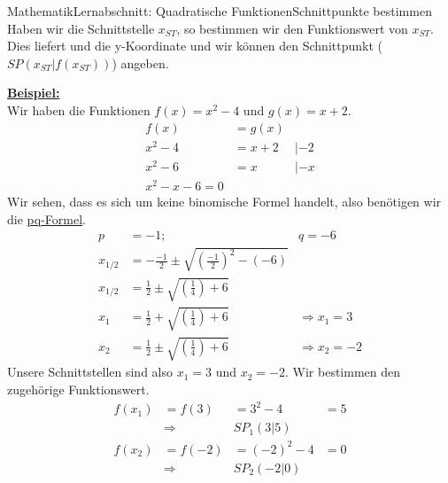 \documentclass[11pt,twocolumn,oneside,openany,headings=optiontotoc,11pt,numbers=noenddot]{article}
\begin{document}
\begin{worksheet}{Mathematik}{Lernabschnitt: Quadratische Funktionen}{Schnittpunkte bestimmen}
		Haben wir die Schnittstelle \(x_{ST}\), so bestimmen wir den Funktionswert von \(x_{ST}\). Dies liefert und die y-Koordinate und wir können den Schnittpunkt (\(SP(x_{ST}|f(x_{ST}))\)) angeben.
		\par\noindent
		\underline{\textbf{Beispiel:}}\\
		Wir haben die Funktionen \(f(x) = x^2 - 4\) und \(g(x) = x+2\).\\
		\begin{align*}
			f(x) & = g(x)\\
			x^2 - 4 & = x + 2 & | -2\\
			x^2 - 6 & = x & | -x\\
			x^2 -x -6 = 0
		\end{align*}
		Wir sehen, dass es sich um keine binomische Formel handelt, also benötigen wir die \underline{pq-Formel}.
		\begin{align*}
			p & = -1; & q = - 6\\
			x_{1/2} & = -\frac{-1}{2} \pm \sqrt{\left(\frac{-1}{2}\right)^2 - (-6)}\\
			x_{1/2} & = \frac{1}{2} \pm \sqrt{\left(\frac{1}{4}\right) + 6}\\
			x_1 & = \frac{1}{2} + \sqrt{\left(\frac{1}{4}\right) + 6} & \Rightarrow x_1 = 3\\
			x_2 & = \frac{1}{2} \pm \sqrt{\left(\frac{1}{4}\right) + 6} & \Rightarrow x_2 = -2
		\end{align*}
		Unsere Schnittstellen sind also \colorbox{green!10}{\(x_1 = 3\)} und \colorbox{green!10}{\(x_2 = -2\)}. Wir bestimmen den zugehörige Funktionswert.\\
		\begin{align*}
			f(x_1) & = f(3)  & = 3^2 - 4  & = 5\\
			& \Rightarrow & SP_1(3|5) & \\
			f(x_2) & = f(-2) & = (-2)^2 - 4 & = 0\\
			& \Rightarrow & SP_2(-2|0) &
		\end{align*}
	\end{worksheet}
\end{document}
